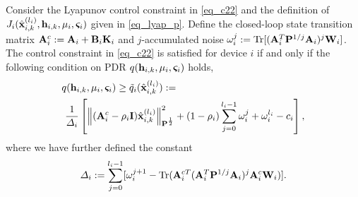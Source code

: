 \begin{proposition}\label{prop_pdr_constraint}
Consider the Lyapunov control constraint in \eqref{eq_c22} and the definition of $J_i({\hat{\mathbf x} }^{(l_i)}_{i,k},{\mathbf h}_{i,k},\mu_i,\boldsymbol{\varsigma}_i)$ given in \eqref{eq_lyap_p}.  Define the closed-loop state transition matrix ${\mathbf A}^c_i := {\mathbf A}_i + {\mathbf B}_i {\mathbf K}_i$ and $j$-accumulated noise $\omega_i^j := \text{Tr}[({\mathbf A}_i^T{\mathbf P}^{1/j} {\mathbf A}_i)^{j} {\mathbf W}_i]$. The control constraint in \eqref{eq_c22} is satisfied for device $i$ if and only if the following condition on PDR $q({\mathbf h}_{i,k},\mu_i,\boldsymbol{\varsigma}_i)$ holds, 
%
\begin{align}\label{eq_pdr_constraint}
&q(\bbh_{i,k},\mu_i,\bbsigma_i) \geq \tdq_i(\hbx^{(l_i)}_{i,k}) :=  \\ &\ \frac{1}{\Delta_i} \left[  \left\| (\bbA^c_i - \rho_i\bbI)\hbx^{(l_i)}_{i,k} \right\|_{\bbP^{\frac{1}{2}}}^2+ (1-\rho_i)\sum_{j=0}^{l_i-1} \omega_i^j + \omega_i^{l_i} - c_i  \right],  \nonumber
\end{align}
%
where we have further defined the constant
%
\begin{equation}\label{eq_noise_diff}
\Delta_i :=  \sum_{j=0}^{l_i-1}[\omega^{j+1}_i - \Tr(\bbA^{cT}_i (\bbA_i^T\bbP^{1/j}\bbA_i)^j \bbA^c_i\bbW_i)  ].
\end{equation}
\end{proposition}

